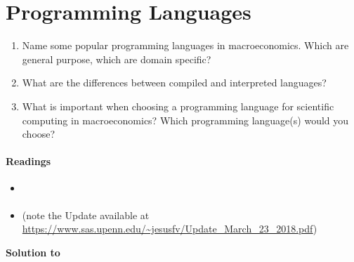 \section[Programming Languages]{Programming Languages\label{ex:ProgrammingLanguages}}
\begin{enumerate}
\item Name some popular programming languages in macroeconomics.
Which are general purpose, which are domain specific?
\item What are the differences between compiled and interpreted languages?
\item What is important when choosing a programming language for scientific computing in macroeconomics?
Which programming language{(s)} would you choose?
\end{enumerate}

\paragraph{Readings}
\begin{itemize}
\item \textcite{Aguirre.Danielsson_2020_WhichProgrammingLanguage}
\item \textcite{Aruoba.Fernandez-Villaverde_2015_ComparisonProgrammingLanguages} (note the Update available at \url{https://www.sas.upenn.edu/~jesusfv/Update_March_23_2018.pdf})
\end{itemize}

\begin{solution}\textbf{Solution to }
\ifDisplaySolutions%

\fi
\newpage
\end{solution}